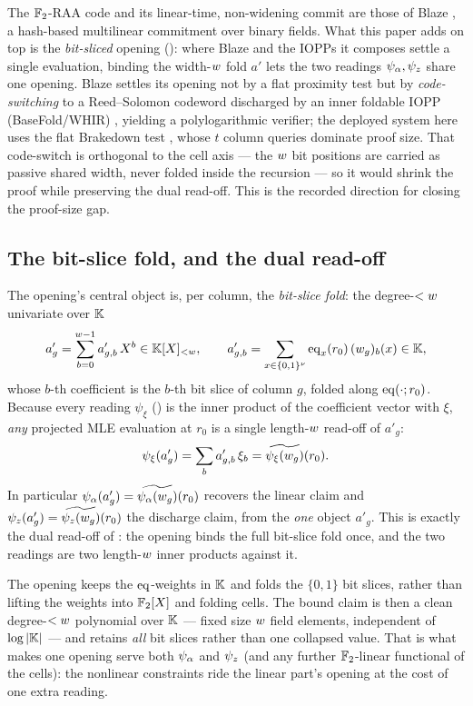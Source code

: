 \begin{remark}
\label{rem:blaze}
The $\mathbb{F}_2$-RAA code and its linear-time, non-widening commit are those of Blaze
\cite{blaze}, a hash-based multilinear commitment over binary fields. What this
paper adds on top is the \emph{bit-sliced} opening ():
where Blaze and the IOPPs it composes settle a single evaluation, binding the
width-$w$ fold $a'$ lets the two readings $\psi_{\alpha},\psi_{z}$ share one opening.
Blaze settles its opening not by a flat proximity test but by
\emph{code-switching} to a Reed--Solomon codeword discharged by an inner
foldable IOPP (BaseFold/WHIR) \cite{basefold,whir}, yielding a polylogarithmic
verifier; the deployed system here uses the flat Brakedown test \cite{brakedown},
whose $t$ column queries dominate proof size. That code-switch is orthogonal to
the cell axis --- the $w$ bit positions are carried as passive shared width,
never folded inside the recursion --- so it would shrink the proof while
preserving the dual read-off. This is the recorded direction for closing the
proof-size gap.
\end{remark}

\subsection{The bit-slice fold, and the dual read-off}
\label{sec:bit-slice-fold}

The opening's central object is, per column, the \emph{bit-slice fold}: the
degree-$<w$ univariate over $\mathbb{K}$
\[
  a'_g = \sum_{b=0}^{w-1} a'_{g,b}\,X^b \in \mathbb{K}[X]_{<w},
  \qquad
  a'_{g,b} = \sum_{x\in\{0,1\}^{\nu}} \operatorname{eq}_x(r_0)\,(w_{g})_b(x)\in\mathbb{K},
\]
whose $b$-th coefficient is the $b$-th bit slice of column $g$, folded along
$\operatorname{eq}(\cdot;r_0)$. Because every reading $\psi_\xi$ () is the
inner product of the coefficient vector with $\xi$, \emph{any} projected MLE
evaluation at $r_0$ is a single length-$w$ read-off of $a'_g$:
\[
  \psi_\xi(a'_g) = \sum_b a'_{g,b}\,\xi_b = \widetilde{\psi_\xi(w_g)}(r_0).
\]
In particular $\psi_{\alpha}(a'_g) = \widetilde{\psi_{\alpha}(w_g)}(r_0)$ recovers the linear claim and
$\psi_{z}(a'_g) = \widetilde{\psi_{z}(w_g)}(r_0)$ the discharge claim, from the \emph{one}
object $a'_g$. This is exactly the dual read-off of : the
opening binds the full bit-slice fold once, and the two readings are two
length-$w$ inner products against it.

\begin{remark}
\label{rem:why-bitsliced}
The opening keeps the $\operatorname{eq}$-weights in $\mathbb{K}$ and folds the $\{0,1\}$ bit slices,
rather than lifting the weights into $\mathbb{F}_2[X]$ and folding cells. The bound
claim is then a clean degree-$<w$ polynomial over $\mathbb{K}$ --- fixed size $w$
field elements, independent of $\log|\mathbb{K}|$ --- and retains \emph{all} bit slices
rather than one collapsed value. That is what makes one opening serve both
$\psi_{\alpha}$ and $\psi_{z}$ (and any further $\mathbb{F}_2$-linear functional of the cells): the
nonlinear constraints ride the linear part's opening at the cost of one extra
reading.
\end{remark}


